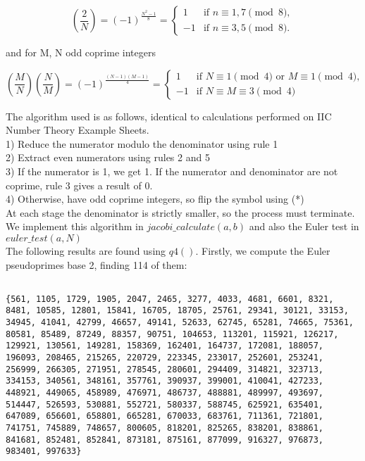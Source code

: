 \documentclass[10pt,a4paper]{report}
\newcommand{\legendre}[2]{(\frac{#1}{#2})}
\begin{document}
\begin{equation*}
\legendre{2}{N} = (-1)^{\frac{N^2-1}{8}} = \begin{cases} 1 & \text{if }n \equiv 1,7 \pmod 8,\\
-1 & \text{if }n \equiv 3,5\pmod 8.
\end{cases}
\tag{5}
\end{equation*}

and for M, N odd coprime integers

\begin{equation*}
\legendre{M}{N}\legendre{N}{M} = (-1)^{\frac{(N-1)(M-1)}{4}} =
\begin{cases}
1 & \text{if } N \equiv 1 \pmod 4 \text{ or } M \equiv 1 \pmod 4,\\
-1 & \text{if } N\equiv M \equiv 3 \pmod 4
\end{cases}
\tag{*}
\end{equation*}

The algorithm used is as follows, identical to calculations performed on IIC Number Theory Example Sheets.\\

1) Reduce the numerator modulo the denominator using rule 1 \\
2) Extract even numerators using rules 2 and 5\\
3) If the numerator is 1, we get 1. If the numerator and denominator are not coprime, rule 3 gives a result of 0.\\
4) Otherwise, have odd coprime integers, so flip the symbol using (*)\\


At each stage the denominator is strictly smaller, so the process must terminate. We implement this algorithm in $jacobi\_calculate(a,b)$ and also the Euler test in $euler\_test(a,N)$\\


The following results are found using $q4()$. Firstly, we compute the Euler pseudoprimes base 2, finding 114 of them:

\begin{lstlisting}[breaklines]

{561, 1105, 1729, 1905, 2047, 2465, 3277, 4033, 4681, 6601, 8321, 8481, 10585, 12801, 15841, 16705, 18705, 25761, 29341, 30121, 33153, 34945, 41041, 42799, 46657, 49141, 52633, 62745, 65281, 74665, 75361, 80581, 85489, 87249, 88357, 90751, 104653, 113201, 115921, 126217, 129921, 130561, 149281, 158369, 162401, 164737, 172081, 188057, 196093, 208465, 215265, 220729, 223345, 233017, 252601, 253241, 256999, 266305, 271951, 278545, 280601, 294409, 314821, 323713, 334153, 340561, 348161, 357761, 390937, 399001, 410041, 427233, 448921, 449065, 458989, 476971, 486737, 488881, 489997, 493697, 514447, 526593, 530881, 552721, 580337, 588745, 625921, 635401, 647089, 656601, 658801, 665281, 670033, 683761, 711361, 721801, 741751, 745889, 748657, 800605, 818201, 825265, 838201, 838861, 841681, 852481, 852841, 873181, 875161, 877099, 916327, 976873, 983401, 997633}

\end{lstlisting}
\end{document}
